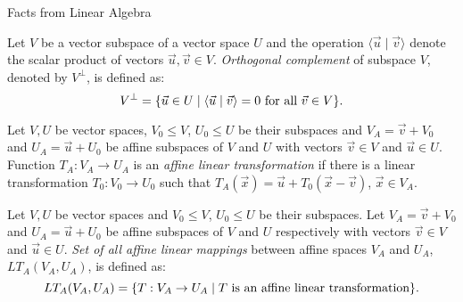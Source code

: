 \begin{chapter}{Facts from Linear Algebra}
\begin{definition}
Let $V$ be a vector subspace of a vector space $U$ and the operation $\langle \vec{u} \mid \vec{v} \rangle$ denote the scalar product of vectors $\vec{u}, \vec{v} \in V$. \emph{Orthogonal complement} of subspace $V$, denoted by $V ^ {\bot}$, is defined as:
\[
	V ^ {\bot} = \{ \vec{u} \in U \mid \langle \vec{u} \mid \vec{v} \rangle = 0 \text{ for all } \vec{v} \in V \} \text{.}
\]
\end{definition}

\begin{definition}
\label{definition-affine-linear-map}
Let $V, U$ be vector spaces, $V_0 \leq V$, $U_0 \leq U$ be their subspaces and $V_A = \vec{v} + V_0$ and $U_A = \vec{u} + U_0$ be affine subspaces of $V$ and $U$ with vectors $\vec{v} \in V$ and $\vec{u} \in U$. Function $T_A: V_A \rightarrow U_A$ is an \emph{affine linear transformation} if there is a linear transformation $T_0: V_0 \rightarrow U_0$ such that $T_A(\vec{x}) = \vec{u} + T_0(\vec{x} - \vec{v})$, $\vec{x} \in V_A$.
\end{definition}

\begin{definition}
Let $V, U$ be vector spaces and $V_0 \leq V$, $U_0 \leq U$ be their subspaces. Let $V_A = \vec{v} + V_0$ and $U_A = \vec{u} + U_0$ be affine subspaces of $V$ and $U$ respectively with vectors $\vec{v} \in V$ and $\vec{u} \in U$. \emph{Set of all affine linear mappings} between affine spaces $V_A$ and $U_A$, $LT_A(V_A, U_A)$, is defined as:
\[
	LT_A(V_A, U_A) = \{ T: V_A \rightarrow U_A \mid T \text{ is an affine linear transformation} \} \text{.}
\]
\end{definition}


\end{chapter}
